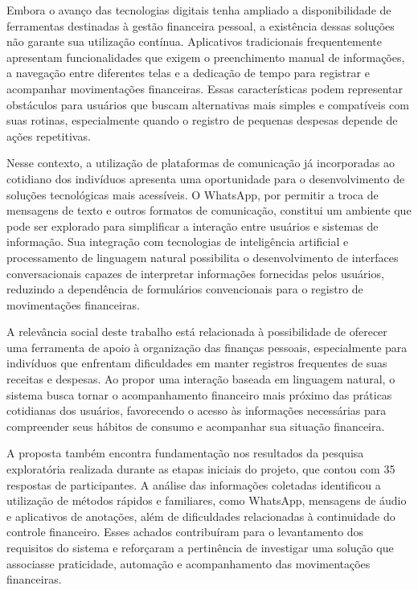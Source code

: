 Embora o avanço das tecnologias digitais tenha ampliado a disponibilidade de ferramentas destinadas à gestão financeira pessoal, a existência dessas soluções não garante sua utilização contínua. Aplicativos tradicionais frequentemente apresentam funcionalidades que exigem o preenchimento manual de informações, a navegação entre diferentes telas e a dedicação de tempo para registrar e acompanhar movimentações financeiras. Essas características podem representar obstáculos para usuários que buscam alternativas mais simples e compatíveis com suas rotinas, especialmente quando o registro de pequenas despesas depende de ações repetitivas.

Nesse contexto, a utilização de plataformas de comunicação já incorporadas ao cotidiano dos indivíduos apresenta uma oportunidade para o desenvolvimento de soluções tecnológicas mais acessíveis. O WhatsApp, por permitir a troca de mensagens de texto e outros formatos de comunicação, constitui um ambiente que pode ser explorado para simplificar a interação entre usuários e sistemas de informação. Sua integração com tecnologias de inteligência artificial e processamento de linguagem natural possibilita o desenvolvimento de interfaces conversacionais capazes de interpretar informações fornecidas pelos usuários, reduzindo a dependência de formulários convencionais para o registro de movimentações financeiras.

A relevância social deste trabalho está relacionada à possibilidade de oferecer uma ferramenta de apoio à organização das finanças pessoais, especialmente para indivíduos que enfrentam dificuldades em manter registros frequentes de suas receitas e despesas. Ao propor uma interação baseada em linguagem natural, o sistema busca tornar o acompanhamento financeiro mais próximo das práticas cotidianas dos usuários, favorecendo o acesso às informações necessárias para compreender seus hábitos de consumo e acompanhar sua situação financeira.

A proposta também encontra fundamentação nos resultados da pesquisa exploratória realizada durante as etapas iniciais do projeto, que contou com 35 respostas de participantes. A análise das informações coletadas identificou a utilização de métodos rápidos e familiares, como WhatsApp, mensagens de áudio e aplicativos de anotações, além de dificuldades relacionadas à continuidade do controle financeiro. Esses achados contribuíram para o levantamento dos requisitos do sistema e reforçaram a pertinência de investigar uma solução que associasse praticidade, automação e acompanhamento das movimentações financeiras.

